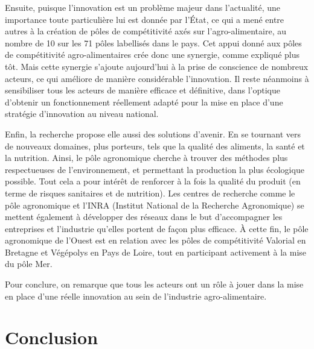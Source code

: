\documentclass[a4paper,12pt]{report}
\begin{document}
			Ensuite, puisque l’innovation est un problème majeur dans l’actualité, une importance toute particulière lui est donnée par l’État, ce qui a mené entre autres à la création de pôles de compétitivité axés sur l’agro-alimentaire, au nombre de 10 sur les 71 pôles labellisés dans le pays\cite{CompetitiviteGouv}. Cet appui donné aux pôles de compétitivité agro-alimentaires crée donc une synergie, comme expliqué plus tôt. Mais cette synergie s’ajoute aujourd’hui à la prise de conscience de nombreux acteurs, ce qui améliore de manière considérable l’innovation. Il reste néanmoins à sensibiliser tous les acteurs de manière efficace et définitive, dans l’optique d’obtenir un fonctionnement réellement adapté pour la mise en place d’une stratégie d’innovation au niveau national.

			Enfin, la recherche propose elle aussi des solutions d’avenir. En se tournant vers de nouveaux domaines, plus porteurs, tels que la qualité des aliments, la santé et la nutrition. Ainsi, le pôle agronomique cherche à trouver des méthodes plus respectueuses de l’environnement, et permettant la production la plus écologique possible\cite{PoleAgroOuest}. Tout cela a pour intérêt de renforcer à la fois la qualité du produit (en terme de risques sanitaires et de nutrition). Les centres de recherche comme le pôle agronomique et l’INRA (Institut National de la Recherche Agronomique) se mettent également à développer des réseaux dans le but d’accompagner les entreprises et l’industrie qu’elles portent de façon plus efficace. À cette fin, le pôle agronomique de l’Ouest est en relation avec les pôles de compétitivité Valorial en Bretagne et Végépolys en Pays de Loire, tout en participant activement à la mise du pôle Mer\cite{PoleAgroOuest}. 

  			 Pour conclure, on remarque que tous les acteurs ont un rôle à jouer dans la mise en place d’une réelle innovation au sein de l’industrie agro-alimentaire.

\chapter*{Conclusion}

{}
\end{document}
